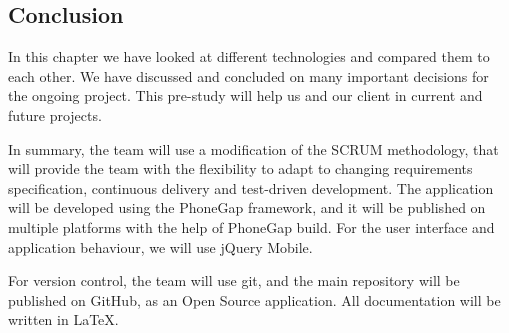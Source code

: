 \subsection{Conclusion}
In this chapter we have looked at different technologies and compared them to each other.  We have discussed and concluded on many important decisions for the ongoing project. This pre-study will help us and our client in current and future projects.

In summary, the team will use a modification of the SCRUM methodology, that will provide the team with the flexibility to adapt to changing requirements specification, continuous delivery and test-driven development. The application will be developed using the PhoneGap framework, and it will be published on multiple platforms with the help of PhoneGap build. For the user interface and application behaviour, we will use jQuery Mobile. 

For version control, the team will use git, and the main repository will be published on GitHub, as an Open Source application. All documentation will be written in LaTeX.

